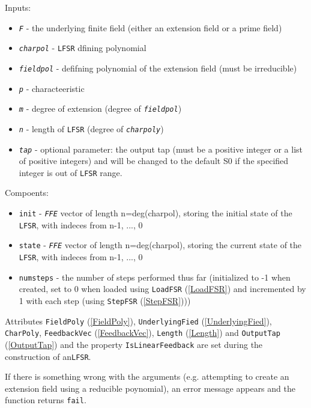 \documentclass[a4paper,11pt]{report}
\begin{document}
{{{ Inputs: 
\begin{itemize}
\item  \mbox{\texttt{\mdseries\slshape F}} - the underlying finite field (either an extension field or a prime field)
\item  \mbox{\texttt{\mdseries\slshape charpol}} - \texttt{LFSR} dfining polynomial 
\item  \mbox{\texttt{\mdseries\slshape fieldpol}} - defifning polynomial of the extension field (must be irreducible)
\item  \mbox{\texttt{\mdseries\slshape p}} - characteeristic 
\item  \mbox{\texttt{\mdseries\slshape m}} - degree of extension (degree of \mbox{\texttt{\mdseries\slshape fieldpol}}) 
\item  \mbox{\texttt{\mdseries\slshape n}} - length of \texttt{LFSR} (degree of \mbox{\texttt{\mdseries\slshape charpoly}})
\item  \mbox{\texttt{\mdseries\slshape tap}} - optional parameter: the output tap (must be a positive integer or a list of
positive integers) and will be changed to the default S{\textunderscore}0 if
the specified integer is out of \texttt{LFSR} range.
\end{itemize}
 Compoents: 
\begin{itemize}
\item  \texttt{init} - \mbox{\texttt{\mdseries\slshape FFE}} vector of length n=deg(charpol), storing the initial state of the \texttt{LFSR}, with indeces from n-1, ..., 0
\item  \texttt{state} - \mbox{\texttt{\mdseries\slshape FFE}} vector of length n=deg(charpol), storing the current state of the \texttt{LFSR}, with indeces from n-1, ..., 0
\item  \texttt{numsteps} - the number of steps performed thus far (initialized to -1 when created, set
to 0 when loaded using \texttt{LoadFSR} (\ref{LoadFSR}) and incremented by 1 with each step (using \texttt{StepFSR} (\ref{StepFSR}))) 
\end{itemize}
 Attributes \texttt{FieldPoly} (\ref{FieldPoly}), \texttt{UnderlyingFied} (\ref{UnderlyingFied}), \texttt{CharPoly}, \texttt{FeedbackVec} (\ref{FeedbackVec}), \texttt{Length} (\ref{Length}) and \texttt{OutputTap} (\ref{OutputTap}) and the property \texttt{IsLinearFeedback} are set during the construction of an\texttt{LFSR}. 

 If there is something wrong with the arguments (e.g. attempting to create an
extension field using a reducible poynomial), an error message appears and the
function returns \texttt{fail}.

}}}
\end{document}
